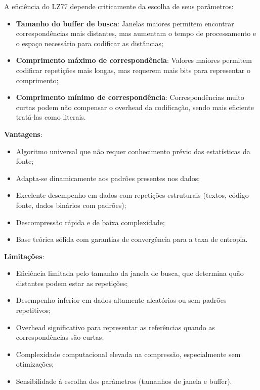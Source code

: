 A eficiência do LZ77 depende criticamente da escolha de seus parâmetros:

\begin{itemize}
    \item \textbf{Tamanho do buffer de busca}: Janelas maiores permitem encontrar correspondências mais distantes, mas aumentam o tempo de processamento e o espaço necessário para codificar as distâncias;
    
    \item \textbf{Comprimento máximo de correspondência}: Valores maiores permitem codificar repetições mais longas, mas requerem mais bits para representar o comprimento;
    
    \item \textbf{Comprimento mínimo de correspondência}: Correspondências muito curtas podem não compensar o overhead da codificação, sendo mais eficiente tratá-las como literais.
\end{itemize}

\textbf{Vantagens}:
\begin{itemize}
    \item Algoritmo universal que não requer conhecimento prévio das estatísticas da fonte;
    \item Adapta-se dinamicamente aos padrões presentes nos dados;
    \item Excelente desempenho em dados com repetições estruturais (textos, código fonte, dados binários com padrões);
    \item Descompressão rápida e de baixa complexidade;
    \item Base teórica sólida com garantias de convergência para a taxa de entropia.
\end{itemize}

\textbf{Limitações}:
\begin{itemize}
    \item Eficiência limitada pelo tamanho da janela de busca, que determina quão distantes podem estar as repetições;
    \item Desempenho inferior em dados altamente aleatórios ou sem padrões repetitivos;
    \item Overhead significativo para representar as referências quando as correspondências são curtas;
    \item Complexidade computacional elevada na compressão, especialmente sem otimizações;
    \item Sensibilidade à escolha dos parâmetros (tamanhos de janela e buffer).
\end{itemize}

